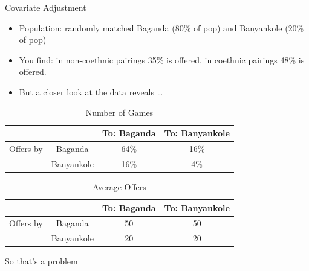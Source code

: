 \documentclass[
  11pt,
  ignorenonframetext,
]{beamer}
\providecommand{\tightlist}{%
  \setlength{\itemsep}{0pt}\setlength{\parskip}{0pt}}\usepackage{longtable,booktabs,array}
\begin{document}
\begin{frame}{Covariate Adjustment}
\protect\hypertarget{covariate-adjustment-2}{}
\begin{itemize}
\tightlist
\item
  Population: randomly matched Baganda (80\% of pop) and Banyankole
  (20\% of pop)
\item
  You find: in non-coethnic pairings 35\% is offered, in coethnic
  pairings 48\% is offered.
\item
  But a closer look at the data reveals \dots
\end{itemize}

\begin{table}[h!]    \footnotesize
    \begin{tabular}{cc|cc}  \footnotesize
&   &       To: Baganda &To: Banyankole \\ \hline
Offers by   &Baganda    &64\%   & 16\% \\
    &Banyankole &16\%   &4\% \\
    \end{tabular}
    \caption{\small Number of Games}
\end{table}

\begin{table}[h!]    \footnotesize
    \begin{tabular}{cc|cc} \footnotesize
&   &       To: Baganda &To: Banyankole \\ \hline
Offers by   &Baganda    &50 & 50 \\
    &Banyankole &20 &20 \\
    \end{tabular}
    \caption{\small  Average Offers}
\end{table}

\footnotesize So that's a problem
\end{frame}
\end{document}
